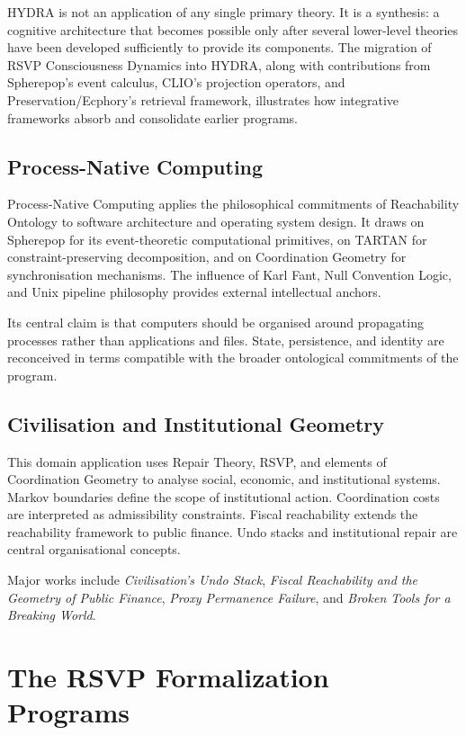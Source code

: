\documentclass[12pt, twoside]{article}
\begin{document}
HYDRA is not an application of any single primary theory. It is a synthesis:
a cognitive architecture that becomes possible only after several lower-level
theories have been developed sufficiently to provide its components. The
migration of RSVP Consciousness Dynamics into HYDRA, along with contributions
from Spherepop's event calculus, CLIO's projection operators, and
Preservation/Ecphory's retrieval framework, illustrates how integrative
frameworks absorb and consolidate earlier programs.

\subsection{Process-Native Computing}

Process-Native Computing applies the philosophical commitments of
Reachability Ontology to software architecture and operating system design.
It draws on Spherepop for its event-theoretic computational primitives, on
TARTAN for constraint-preserving decomposition, and on Coordination Geometry
for synchronisation mechanisms. The influence of Karl Fant, Null Convention
Logic, and Unix pipeline philosophy provides external intellectual anchors.

Its central claim is that computers should be organised around propagating
processes rather than applications and files. State, persistence, and identity
are reconceived in terms compatible with the broader ontological commitments
of the program.

\subsection{Civilisation and Institutional Geometry}

This domain application uses Repair Theory, RSVP, and elements of
Coordination Geometry to analyse social, economic, and institutional systems.
Markov boundaries define the scope of institutional action. Coordination
costs are interpreted as admissibility constraints. Fiscal reachability
extends the reachability framework to public finance. Undo stacks and
institutional repair are central organisational concepts.

Major works include \emph{Civilisation's Undo Stack}, \emph{Fiscal
Reachability and the Geometry of Public Finance}, \emph{Proxy Permanence
Failure}, and \emph{Broken Tools for a Breaking World}.

\section{The RSVP Formalization Programs}
\label{sec:formal}
\end{document}
